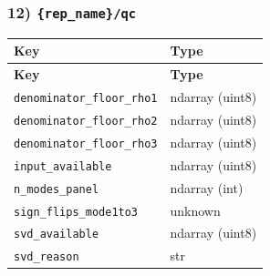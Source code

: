 \documentclass[11pt]{article}
\begin{document}
\subsubsection*{12) \texttt{\{rep\_\allowbreak{}name\}/\allowbreak{}qc}}
\begin{longtable}{|p{}|p{}|}
\hline
\textbf{Key} & \textbf{Type} \\ \hline
\endfirsthead
\hline
\textbf{Key} & \textbf{Type} \\ \hline
\endhead
\texttt{denominator\_\allowbreak{}floor\_\allowbreak{}rho1} & ndarray (uint8) \\ \hline
\texttt{denominator\_\allowbreak{}floor\_\allowbreak{}rho2} & ndarray (uint8) \\ \hline
\texttt{denominator\_\allowbreak{}floor\_\allowbreak{}rho3} & ndarray (uint8) \\ \hline
\texttt{input\_\allowbreak{}available} & ndarray (uint8) \\ \hline
\texttt{n\_\allowbreak{}modes\_\allowbreak{}panel} & ndarray (int) \\ \hline
\texttt{sign\_\allowbreak{}flips\_\allowbreak{}mode1to3} & unknown \\ \hline
\texttt{svd\_\allowbreak{}available} & ndarray (uint8) \\ \hline
\texttt{svd\_\allowbreak{}reason} & str \\ \hline
\end{longtable}
\end{document}
